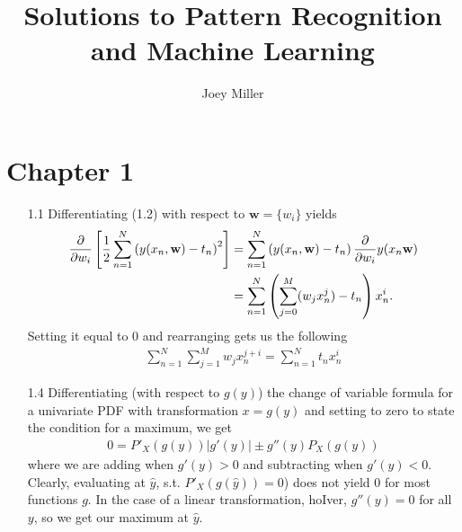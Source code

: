 \documentclass[]{article}
\title{Solutions to Pattern Recognition and Machine Learning}
\author{Joey Miller}
\begin{document}
\maketitle

\section*{Chapter 1}

\begin{enumerate}
	\item[1.1] Differentiating (1.2) with respect to $\textbf{w}=\{w_i\}$ yields
	\begin{align*}
	\frac{\partial}{\partial w_i} \left[ \frac{1}{2}\sum_{n=1}^{N}\left(y(x_n,\text{\textbf{w}})-t_n \right)^2 \right] &= 
	\sum_{n=1}^{N}\left(y(x_n,\text{\textbf{w}})-t_n \right) \frac{\partial}{\partial w_i} y(x_n \text{\textbf{w}}) \\
	& = \sum_{n=1}^{N} \left(  \sum_{j=0}^{M}(w_j x_n^j)  - t_n \right)x_n^i.
	\end{align*}
	Setting it equal to 0 and rearranging gets us the following
	\begin{align*}
	\sum_{n=1}^{N} \sum_{j=1}^{M} w_jx_n^{j+i}=\sum_{n=1}^{N} t_n x_n^i
	\end{align*}
	
	\item[1.4] Differentiating (with respect to $g(y)$) the change of variable formula for a univariate PDF with transformation $x = g(y)$ and setting to zero to state the condition for a maximum, we get
	\begin{align*}
	0 =  P'_X(g(y)) |g'(y)| \pm g''(y)P_X(g(y))
	\end{align*}
	where we are adding when $g'(y)>0$ and subtracting when $g'(y)<0$. Clearly, evaluating at $\hat{y}$, s.t. $P'_X(g(\hat{y}))=0$) does not yield 0 for most functions $g$. In the case of a linear transformation, hoIver, $g''(y)=0$  for all $y$, so we get our maximum at $\hat{y}$. 
	

\end{enumerate}
\end{document}
